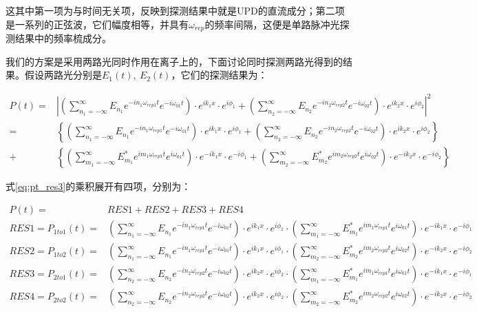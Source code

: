 这其中第一项为与时间无关项，反映到探测结果中就是UPD的直流成分；第二项是一系列的正弦波，它们幅度相等，并具有$\omega_{rep}$的频率间隔，这便是单路脉冲光探测结果中的频率梳成分。

我们的方案是采用两路光同时作用在离子上的，下面讨论同时探测两路光得到的结果。假设两路光分别是$E_1(t),\ E_2(t)$，它们的探测结果为：
\begin{footnotesize}
\begin{align}
    P(t)=&\left|\left(\sum_{n_1=-\infty}^{\infty}E_{n_1}e^{-in_1\omega_{rep1}t}e^{-i\omega_{01}t}\right)\cdot e^{ik_1x}\cdot e^{i\phi_1} + \left(\sum_{n_2=-\infty}^{\infty}E_{n_2}e^{-in_2\omega_{rep2}t}e^{-i\omega_{02}t}\right)\cdot e^{ik_2x}\cdot e^{i\phi_2}\right|^2\\
    =&\left\{\left(\sum_{n_1=-\infty}^{\infty}E_{n_1}e^{-in_1\omega_{rep1}t}e^{-i\omega_{01}t}\right)\cdot e^{ik_1x}\cdot e^{i\phi_1} + \left(\sum_{n_2=-\infty}^{\infty}E_{n_2}e^{-in_2\omega_{rep2}t}e^{-i\omega_{02}t}\right)\cdot e^{ik_2x}\cdot e^{i\phi_2}\right\}\\
    +&\left\{\left(\sum_{m_1=-\infty}^{\infty}E_{m_1}^* e^{im_1\omega_{rep1}t}e^{i\omega_{01}t}\right)\cdot e^{-ik_1x}\cdot e^{-i\phi_1} + \left(\sum_{m_2=-\infty}^{\infty}E_{m_2}^*e^{im_2\omega_{rep2}t}e^{i\omega_{02}t}\right)\cdot e^{-ik_2x}\cdot e^{-i\phi_2}\right\}\label{eq:pt_res3}
\end{align}
\end{footnotesize}


式\eqref{eq:pt_res3}的乘积展开有四项，分别为：
\begin{footnotesize}
\begin{align}
    P(t)=&RES1+RES2+RES3+RES4\\
    RES1=P_{1to1}(t)=&\left(\sum_{n_1=-\infty}^{\infty}E_{n_1}e^{-in_1\omega_{rep1}t}e^{-i\omega_{01}t}\right)\cdot e^{ik_1x}\cdot e^{i\phi_1} 
    \cdot \left(\sum_{m_1=-\infty}^{\infty}E_{m_1}^* e^{im_1\omega_{rep1}t}e^{i\omega_{01}t}\right)\cdot e^{-ik_1x}\cdot e^{-i\phi_1}\\
    RES2=P_{1to2}(t)=&\left(\sum_{n_1=-\infty}^{\infty}E_{n_1}e^{-in_1\omega_{rep1}t}e^{-i\omega_{01}t}\right)\cdot e^{ik_1x}\cdot e^{i\phi_1} 
    \cdot \left(\sum_{m_2=-\infty}^{\infty}E_{m_2}^*e^{im_2\omega_{rep2}t}e^{i\omega_{02}t}\right)\cdot e^{-ik_2x}\cdot e^{-i\phi_2}\\
    RES3=P_{2to1}(t)=&\left(\sum_{n_2=-\infty}^{\infty}E_{n_2}e^{-in_2\omega_{rep2}t}e^{-i\omega_{02}t}\right)\cdot e^{ik_2x}\cdot e^{i\phi_2}
    \cdot \left(\sum_{m_1=-\infty}^{\infty}E_{m_1}^* e^{im_1\omega_{rep1}t}e^{i\omega_{01}t}\right)\cdot e^{-ik_1x}\cdot e^{-i\phi_1}\\
    RES4=P_{2to2}(t)=&\left(\sum_{n_2=-\infty}^{\infty}E_{n_2}e^{-in_2\omega_{rep2}t}e^{-i\omega_{02}t}\right)\cdot e^{ik_2x}\cdot e^{i\phi_2}
    \cdot \left(\sum_{m_2=-\infty}^{\infty}E_{m_2}^*e^{im_2\omega_{rep2}t}e^{i\omega_{02}t}\right)\cdot e^{-ik_2x}\cdot e^{-i\phi_2}
\end{align}
\end{footnotesize}


